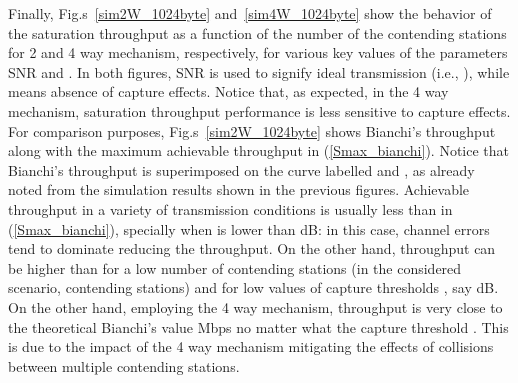 \documentclass[10pt,onecolumn,a4paper]{IEEEtran}
\begin{document}
Finally, Fig.s~\ref{sim2W_1024byte} and~\ref{sim4W_1024byte} show
the behavior of the saturation throughput as a function of the
number of the contending stations for 2 and 4 way mechanism,
respectively, for various key values of the parameters SNR and
. In both figures, SNR is used to signify ideal
transmission (i.e., ), while  means absence of
capture effects. Notice that, as expected, in the 4 way mechanism,
saturation throughput performance is less sensitive to capture
effects. For comparison purposes, Fig.s~\ref{sim2W_1024byte} shows
Bianchi's throughput along with the maximum achievable
throughput in (\ref{Smax_bianchi}). Notice that Bianchi's
throughput is superimposed on the curve labelled  and
, as already noted from the simulation results shown
in the previous figures. Achievable throughput in a variety of
transmission conditions is usually less than  in
(\ref{Smax_bianchi}), specially when  is lower than dB:
in this case, channel errors tend to dominate reducing the
throughput. On the other hand, throughput can be higher than 
for a low number of contending stations (in the considered
scenario,  contending stations) and for low values
of capture thresholds , say dB. On the other hand,
employing the 4 way mechanism, throughput is very close to the
theoretical Bianchi's value  Mbps no matter what the capture
threshold . This is due to the impact of the 4 way
mechanism mitigating the effects of collisions between
multiple contending stations.
\end{document}
